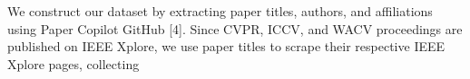 \documentclass{article}
\begin{document}
We construct our dataset by extracting paper titles, authors, and affiliations using Paper Copilot GitHub [4]. Since CVPR, ICCV, and WACV proceedings are published on IEEE Xplore, we use paper titles to scrape their respective IEEE Xplore pages, collecting 
\end{document}
